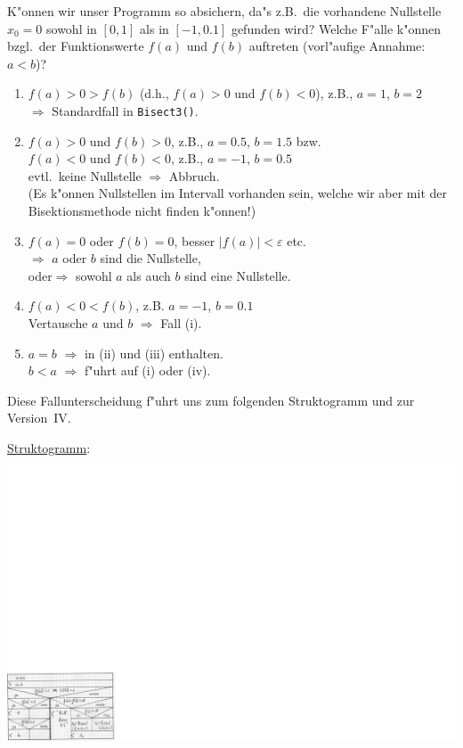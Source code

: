 K"onnen wir unser Programm so absichern, da"s z.B.\   die
vorhandene Nullstelle $x_0=0$ sowohl in $[0,1]$ als in $[-1,0.1]$
gefunden wird? Welche F"alle k"onnen bzgl.\
der Funktionswerte $f(a)$ und $f(b)$ auftreten (vorl"aufige Annahme: $a<b$)?
\begin{enumerate}
 \renewcommand {\labelenumi}{(\roman{enumi})}
%
 \item $f(a) > 0 > f(b)$ (d.h., $f(a) > 0$ und  $f(b) < 0$), z.B., $a=1$, $b=2$
       \\ \mbox{}\hfill$\Longrightarrow$
       Standardfall in \verb|Bisect3()|.
%
 \item $f(a)>0$ und $f(b)>0$, z.B., $a=0.5$, $b=1.5$ bzw. \\
       $f(a)<0$ und $f(b)<0$, z.B., $a=-1$, $b=0.5$
       \\  evtl.\  keine Nullstelle \mbox{}\hfill $\Longrightarrow$
       Abbruch.
       \\
       (Es k"onnen Nullstellen im Intervall vorhanden sein, welche wir
       aber mit der Bisektionsmethode nicht finden k"onnen!)
%
 \item $f(a)=0$ oder $f(b)=0$, besser $|f(a)|<\varepsilon$ etc.
       \\ \mbox{}\hfill $\Longrightarrow$
       $a$ oder $b$ sind die Nullstelle,
       \\ oder\mbox{}\hfill $\Longrightarrow$
       sowohl $a$ als auch $b$ sind eine Nullstelle.
%
 \item $f(a) < 0 < f(b)$, z.B.  $a=-1$, $b=0.1$ \\
 	Vertausche $a$ und $b$ \hfill $\Longrightarrow$ Fall (i).
%
 \item $a=b$  \hfill $\Longrightarrow$ in (ii) und (iii) enthalten.\\
       $b<a$  \hfill $\Longrightarrow$ f"uhrt auf (i) oder (iv).
\end{enumerate}

Diese Fallunterscheidung f"uhrt uns zum folgenden Struktogramm und
zur Version~IV.
%
%

\pagebreak[2]
\underline{Struktogramm}: \\
\includegraphics[scale=0.7]{GIF/p88}


